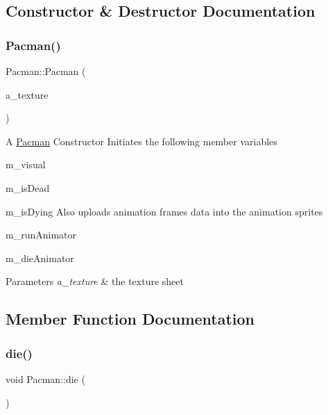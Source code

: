 \subsection{Constructor \& Destructor Documentation}
\mbox{\label{class_pacman_a7be693fb4bf4dc49ede1f022e79022e0}} 
\subsubsection{\texorpdfstring{Pacman()}{Pacman()}}
{\footnotesize\ttfamily Pacman\+::\+Pacman (\begin{DoxyParamCaption}\item[{sf\+::\+Texture \&}]{a\+\_\+texture }\end{DoxyParamCaption})}

A \hyperlink{class_pacman}{Pacman} Constructor Initiates the following member variables
\begin{DoxyItemize}
\item m\+\_\+visual
\item m\+\_\+is\+Dead
\item m\+\_\+is\+Dying Also uploads animation frames data into the animation sprites
\item m\+\_\+run\+Animator
\item m\+\_\+die\+Animator
\end{DoxyItemize}


\begin{DoxyParams}{Parameters}
{\em a\+\_\+texture} & the texture sheet \\
\hline
\end{DoxyParams}


\subsection{Member Function Documentation}
\mbox{\label{class_pacman_a880f3f899b2f2d1ee9969fa049f7289d}} 
\subsubsection{\texorpdfstring{die()}{die()}}
{\footnotesize\ttfamily void Pacman\+::die (\begin{DoxyParamCaption}{ }\end{DoxyParamCaption})}

